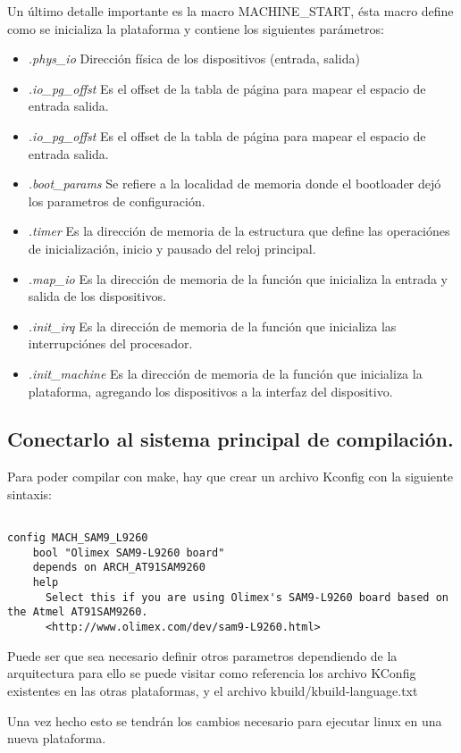 Un último detalle importante es la macro MACHINE\_START, ésta macro define como se inicializa la plataforma y contiene los siguientes parámetros:

\begin{itemize}
\item \emph{.phys\_io} Dirección física de los dispositivos (entrada, salida)
\item \emph{.io\_pg\_offst} Es el offset de la tabla de página 	para mapear el espacio de entrada salida.
\item \emph{.io\_pg\_offst} Es el offset de la tabla de página 	para mapear el espacio de entrada salida.
\item \emph{.boot\_params} Se refiere a la localidad de memoria donde el bootloader dejó los parametros de configuración.
\item \emph{.timer} Es la dirección de memoria de la estructura que define las operaciónes de inicialización, inicio y pausado del reloj principal.
\item \emph{.map\_io} Es la dirección de memoria de la función que inicializa la entrada y salida de los dispositivos.
\item \emph{.init\_irq} Es la dirección de memoria de la función que inicializa las interrupciónes del procesador.
\item \emph{.init\_machine} Es la dirección de memoria de la función que inicializa la plataforma, agregando los dispositivos a la interfaz del dispositivo.
\end{itemize}

\subsection{Conectarlo al sistema principal de compilaci\'on.}

Para poder compilar con make, hay que crear un archivo Kconfig con la siguiente sintaxis:

\begin{verbatim}

config MACH_SAM9_L9260
	bool "Olimex SAM9-L9260 board"
	depends on ARCH_AT91SAM9260
	help
	  Select this if you are using Olimex's SAM9-L9260 board based on the Atmel AT91SAM9260.
	  <http://www.olimex.com/dev/sam9-L9260.html>

\end{verbatim}

Puede ser que sea necesario definir otros parametros dependiendo de la arquitectura para ello se puede visitar como referencia los archivo KConfig existentes en las otras plataformas, y el archivo kbuild/kbuild-language.txt

Una vez hecho esto se tendrán los cambios necesario para ejecutar linux en una nueva plataforma.

